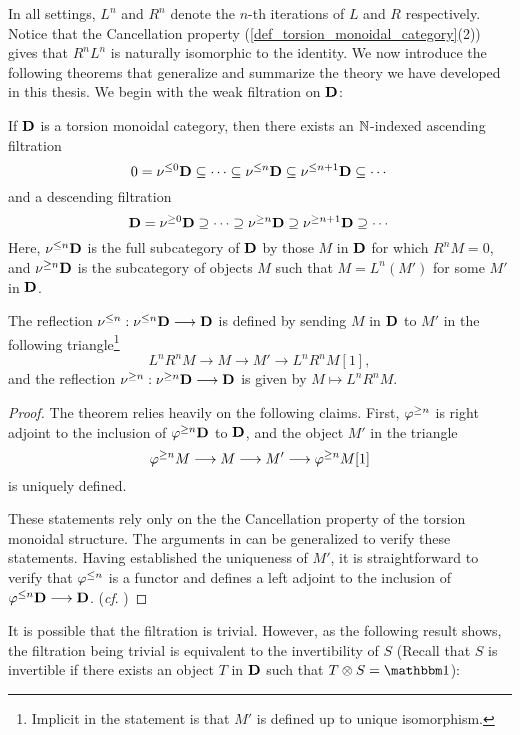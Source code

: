 In all settings, $L^n$ and $R^n$ denote the $n$-th iterations
of $L$ and $R$ respectively. Notice that the Cancellation 
property (\ref{def_torsion_monoidal_category}(2)) gives that $R^nL^n$
is naturally isomorphic to the identity. We now introduce the 
following theorems that generalize and summarize the theory we 
have developed in this thesis. We begin with the weak filtration
on $\mathbf{D}$:

\begin{thm}\label{thm_summary_triang_cat}
If $\mathbf{D}$ is a torsion monoidal category, then there exists
an $\mathbb{N}$-indexed ascending filtration
\[
0 = \nu^{\leq 0}\mathbf{D} \subseteq \cdots \subseteq \nu^{\leq n}\mathbf{D} 
   \subseteq \nu^{\leq n + 1}\mathbf{D} \subseteq \cdots
\]
and a descending filtration
\[
\mathbf{D} = \nu^{\geq 0}\mathbf{D} \supseteq \cdots \supseteq \nu^{\geq n}\mathbf{D} 
\supseteq \nu^{\geq n + 1}\mathbf{D} \supseteq \cdots
\]
Here, $\nu^{\leq n}\mathbf{D}$ is the full subcategory of $\mathbf{D}$ by those 
$M$ in $\mathbf{D}$ for which $R^n M = 0$, and $\nu^{\geq n} \mathbf{D}$ is 
the subcategory of objects $M$ such that $M = L^n(M')$ for some
$M'$ in $\mathbf{D}$.

The reflection $\nu^{\leq n} : \nu^{\leq n} \mathbf{D} \longrightarrow \mathbf{D}$ is defined 
by sending $M$ in $\mathbf{D}$ to $M'$ in the following 
triangle\footnote{Implicit in the statement is that $M'$ is 
defined up to unique isomorphism.}
\[
L^nR^n M \to M \to M' \to L^nR^n M[1],
\]
and the reflection $\nu^{\geq n} : \nu^{\geq n}\mathbf{D} \longrightarrow \mathbf{D}$ is
given by $M \mapsto L^nR^n M$.
\end{thm}
\begin{proof}
The theorem relies heavily on the following claims. First, 
$\varphi^{\geq n}$ is right adjoint to the inclusion of 
$\varphi^{\geq n}\mathbf{D}$ to $\mathbf{D}$, and the object $M'$ in the triangle
\[
\varphi^{\geq n}M \longrightarrow M \longrightarrow M' \longrightarrow \varphi^{\geq n}M[1]
\]
is uniquely defined.

These statements rely only on the the Cancellation property of the 
torsion monoidal structure. The arguments in \cite[1.1, 1.4i]{HuKa}
can be generalized to verify these statements. Having established
the uniqueness of $M'$, it is straightforward to verify that 
$\varphi^{\leq n}$ is a functor and defines a left adjoint to the 
inclusion of $\varphi^{\leq n}\mathbf{D} \longrightarrow \mathbf{D}$. (\emph{cf}. \cite[1.4]{HuKa})
\end{proof}

It is possible that the filtration is trivial. However, as the
following result shows, the filtration being trivial is equivalent
to the invertibility of $S$ (Recall that $S$ is invertible if 
there exists an object $T$ in $\mathbf{D}$ such that $T \tensor S = 
\Unit$):

